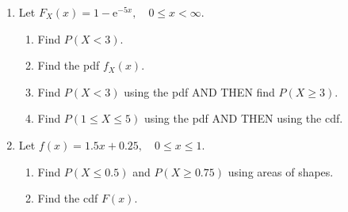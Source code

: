 \documentclass{article}
\newcommand{\e}{\mathrm{e}}		%
\begin{document}
\begin{enumerate}
    \item Let $F_X(x) = 1 - \e^{-5x}, \quad 0 \le x < \infty$.%
    \begin{enumerate}
        \item Find $P(X < 3)$.\vspace{40pt}
        \item Find the pdf $f_X(x)$.\vspace{60pt}
        \item Find $P(X < 3)$ using the pdf AND THEN find $P(X \ge 3)$.\vspace{100pt}
        \item Find $P( 1 \le X \le 5)$ using the pdf AND THEN using the cdf.\vspace{80pt}
    \end{enumerate}
    
    \item Let $f(x) = 1.5x + 0.25, \quad 0 \le x \le 1$.%
    \begin{enumerate}
        \item Find $P(X \le 0.5)$ and $P(X \ge 0.75)$ using areas of shapes.\vspace{60pt}
        \item Find the cdf $F(x)$.\vspace{60pt}
    \end{enumerate}

    
\end{enumerate}
\end{document}
